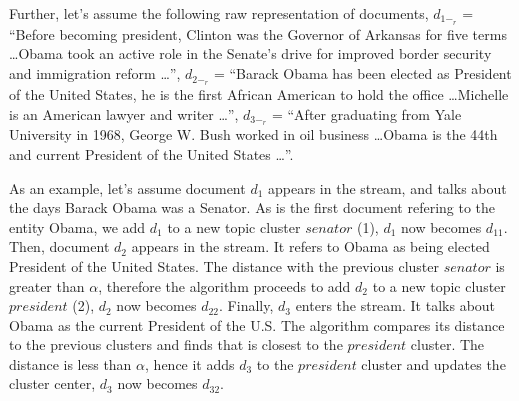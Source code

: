 \documentclass{article}
\begin{document}

Further, let's assume the following raw representation of documents, $d_{1-_r}$ = ``Before becoming president, Clinton was the Governor of Arkansas for five terms \dots Obama took an active role in the Senate's drive for improved border security and immigration reform \dots'', $d_{2-_r}$ = ``Barack Obama has been elected as President of the United States, he is the first African American to hold the office \dots Michelle is an American lawyer and writer \dots'', $d_{3-_r}$ = ``After graduating from Yale University in 1968, George W. Bush worked in oil business \dots Obama is the 44th and current President of the United States \dots''.

As an example, let's assume document $d_1$ appears in the stream, and talks about the days Barack Obama was a Senator. As is the first document refering to the entity Obama, we add $d_1$ to a new topic cluster $senator$ (1), $d_1$ now becomes $d_{11}$. Then, document $d_2$ appears in the stream. It refers to Obama as being elected President of the United States. The distance with the previous cluster $senator$ is greater than $\alpha$, therefore the algorithm proceeds to add $d_2$ to a new topic cluster $president$ (2), $d_2$ now becomes $d_{22}$. Finally, $d_3$ enters the stream. It talks about Obama as the current President of the U.S. The algorithm compares its distance to the previous clusters and finds that is closest to the $president$ cluster. The distance is less than $\alpha$, hence it adds $d_3$ to the $president$ cluster and updates the cluster center, $d_3$ now becomes $d_{32}$.
\end{document}
